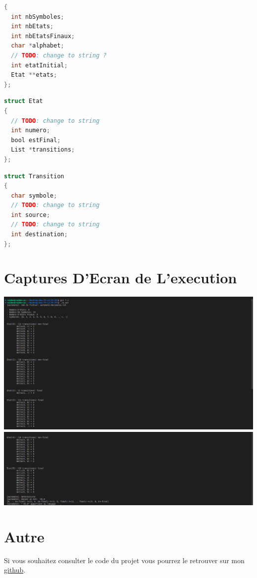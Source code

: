 \documentclass{article}
\begin{document}
\begin{lstlisting}[language=C, caption=Structure Automate]
{
  int nbSymboles;
  int nbEtats;
  int nbEtatsFinaux;
  char *alphabet;
  // TODO: change to string ?
  int etatInitial;
  Etat **etats;
};
\end{lstlisting}

\begin{lstlisting}[language=C, caption=Structure Etat]
struct Etat
{
  // TODO: change to string
  int numero;
  bool estFinal;
  List *transitions;
};
\end{lstlisting}

\begin{lstlisting}[language=C, caption=Structure Transition]
struct Transition
{
  char symbole;
  // TODO: change to string
  int source;
  // TODO: change to string
  int destination;
};
\end{lstlisting}

\section{Captures D'Ecran de L'execution}

\includegraphics[width=\textwidth]{screen-1.png}
\includegraphics[width=\textwidth]{screen-2.png}

\section{Autre}

Si vous souhaitez consulter le code du projet vous pourrez le retrouver sur mon \href{https://www.github.com/raideno/projet}{github}.
\end{document}
